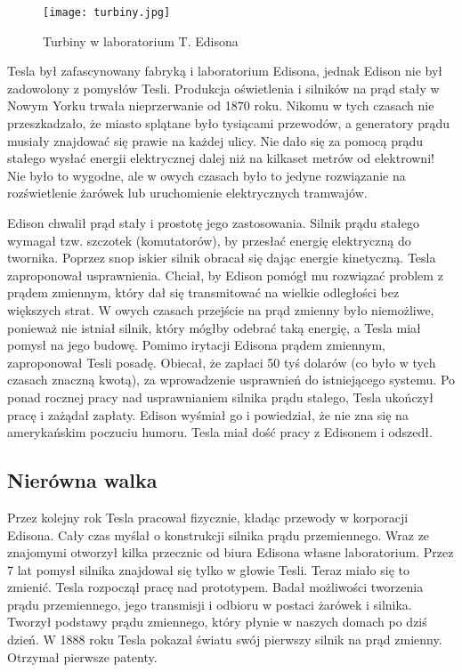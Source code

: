\documentclass{article}
\begin{document}
\begin{large}
\begin{figure}
\vspace{-5pt}
\texttt{[image: turbiny.jpg]}
\vspace{-15pt}
\caption{Turbiny w laboratorium T. Edisona}
\vspace{-10pt}
\end{figure}

\indent Tesla był zafascynowany fabryką i laboratorium Edisona, jednak Edison nie był zadowolony z pomysłów Tesli. Produkcja oświetlenia i silników na prąd stały w Nowym Yorku trwała nieprzerwanie od 1870 roku. Nikomu w tych czasach nie przeszkadzało, że miasto splątane było tysiącami przewodów, a generatory prądu musiały znajdować się prawie na każdej ulicy. Nie dało się za pomocą prądu stałego wysłać energii elektrycznej dalej niż na kilkaset metrów od elektrowni! Nie było to wygodne, ale w owych czasach było to jedyne rozwiązanie na rozświetlenie żarówek lub uruchomienie elektrycznych tramwajów.

\indent Edison chwalił prąd stały i prostotę jego zastosowania. Silnik prądu stałego wymagał tzw. szczotek (komutatorów), by przesłać energię elektryczną do twornika. Poprzez snop iskier silnik obracał się dając energie kinetyczną. Tesla zaproponował usprawnienia. Chciał, by Edison pomógł mu rozwiązać problem z prądem zmiennym, który dał się transmitować na wielkie odległości bez większych strat. W owych czasach przejście na prąd zmienny było niemożliwe, ponieważ nie istniał silnik, który mógłby odebrać taką energię, a Tesla miał pomysł na jego budowę. Pomimo irytacji Edisona prądem zmiennym, zaproponował Tesli posadę. Obiecał, że zapłaci 50 tyś dolarów (co było w tych czasach znaczną kwotą), za wprowadzenie usprawnień do istniejącego systemu. Po ponad rocznej pracy nad usprawnianiem silnika prądu stałego, Tesla ukończył pracę i zażądał zapłaty. Edison wyśmiał go i powiedział, że nie zna się na amerykańskim poczuciu humoru. Tesla miał dość pracy z Edisonem i odszedł.
\cite{art:3}

\subsection{Nierówna walka}

\indent Przez kolejny rok Tesla pracował fizycznie, kładąc przewody w korporacji Edisona. Cały czas myślał o konstrukcji silnika prądu przemiennego. Wraz ze znajomymi otworzył kilka przecznic od biura Edisona własne laboratorium. Przez 7 lat pomysł silnika znajdował się tylko w głowie Tesli. Teraz miało się to zmienić. Tesla rozpoczął pracę nad prototypem. Badał możliwości tworzenia prądu przemiennego, jego transmisji i odbioru w postaci żarówek i silnika. Tworzył podstawy prądu zmiennego, który płynie w naszych domach po dziś dzień. W 1888 roku Tesla pokazał światu swój pierwszy silnik na prąd zmienny. Otrzymał pierwsze patenty.




\end{large}
\end{document}

